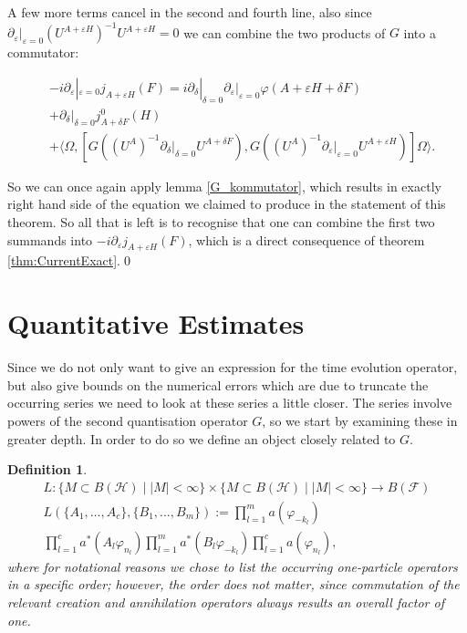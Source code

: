 \documentclass[b5paper,draft,openbib,12pt]{memoir}
\newtheorem{Def}{Definition}[section]
\begin{document}
A few more terms cancel in the second and fourth line, also since \(\partial_\varepsilon |_{\varepsilon=0} \left(U^{A+\varepsilon H}\right)^{-1} U^{A+\varepsilon H}=0\) we can combine the two products of \(G\) into a commutator:

\begin{align*}
&-i\partial_\varepsilon |_{\varepsilon=0} j_{A+\varepsilon H}(F)=
i\partial_\delta |_{\delta=0}   \partial_\varepsilon |_{\varepsilon=0}\varphi(A+\varepsilon H + \delta F)\\
&+\partial_\delta |_{\delta=0}  j^0_{A+\delta F}(H)\\
&+\langle \Omega, \left[G\left( \left(U^{A}\right)^{-1}\partial_\delta |_{\delta=0} U^{A + \delta F} \right), G\left( \left(U^{A}\right)^{-1}\partial_\varepsilon |_{\varepsilon=0} U^{A+\varepsilon H} \right)\right] \Omega \rangle.
\end{align*}

So we can once again apply lemma \ref{G_kommutator}, which results in exactly right hand side of the equation
we claimed to produce in the statement of this theorem. So all that is left is to recognise that one can combine
the first two summands into \(-i \partial_{\varepsilon} j_{A+\varepsilon H} (F)\), which is a direct consequence
of theorem \ref{thm:CurrentExact}.\qed

\section{Quantitative Estimates}

Since we do not only want to give an expression for the time evolution operator, but also give bounds on the numerical errors
which are due to truncate the occurring series we need to look at these series a little closer. The series involve powers of the 
second quantisation operator \(G\), so we start by examining these in greater depth. In order to do so we define an object 
closely related to \(G\).

\begin{Def}
\begin{multline}\label{def:L}
L: \{M\subset B(\mathcal{H})\mid |M|<\infty\} \times \{M\subset B(\mathcal{H})\mid |M|<\infty\} \rightarrow B(\mathcal{F})\\
L(\{A_1,\dots, A_c\},\{ B_1,\dots ,B_m\}):= \prod_{l=1}^m a(\varphi_{-k_l}) \\
\prod_{l=1}^c a^*(A_l \varphi_{n_l}) \prod_{l=1}^m a^*(B_l \varphi_{-k_l}) \prod_{l=1}^c a(\varphi_{n_l}),
\end{multline}
where for notational reasons we chose to list the occurring one-particle operators in a specific order; however, 
the order does not matter, since commutation of the relevant creation and annihilation operators always results an 
overall factor of one.
\end{Def}
\end{document}

